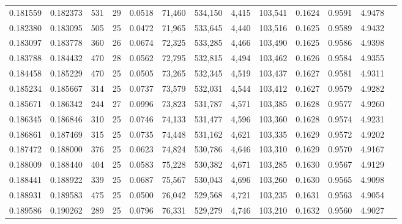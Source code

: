 \begin{tabular}{rrrrrrrrrrrrr}
0.181559 & 0.182373 &   531 &  29 &                                     0.0518 &  71,460 & 534,150 &   4,415 & 103,541 & 0.1624 & 0.9591 & 4.9478 \\
0.182380 & 0.183095 &   505 &  25 &                                     0.0472 &  71,965 & 533,645 &   4,440 & 103,516 & 0.1625 & 0.9589 & 4.9432 \\
0.183097 & 0.183778 &   360 &  26 &                                     0.0674 &  72,325 & 533,285 &   4,466 & 103,490 & 0.1625 & 0.9586 & 4.9398 \\
0.183788 & 0.184432 &   470 &  28 &                                     0.0562 &  72,795 & 532,815 &   4,494 & 103,462 & 0.1626 & 0.9584 & 4.9355 \\
0.184458 & 0.185229 &   470 &  25 &                                     0.0505 &  73,265 & 532,345 &   4,519 & 103,437 & 0.1627 & 0.9581 & 4.9311 \\
0.185234 & 0.185667 &   314 &  25 &                                     0.0737 &  73,579 & 532,031 &   4,544 & 103,412 & 0.1627 & 0.9579 & 4.9282 \\
0.185671 & 0.186342 &   244 &  27 &                                     0.0996 &  73,823 & 531,787 &   4,571 & 103,385 & 0.1628 & 0.9577 & 4.9260 \\
0.186345 & 0.186846 &   310 &  25 &                                     0.0746 &  74,133 & 531,477 &   4,596 & 103,360 & 0.1628 & 0.9574 & 4.9231 \\
0.186861 & 0.187469 &   315 &  25 &                                     0.0735 &  74,448 & 531,162 &   4,621 & 103,335 & 0.1629 & 0.9572 & 4.9202 \\
0.187472 & 0.188000 &   376 &  25 &                                     0.0623 &  74,824 & 530,786 &   4,646 & 103,310 & 0.1629 & 0.9570 & 4.9167 \\
0.188009 & 0.188440 &   404 &  25 &                                     0.0583 &  75,228 & 530,382 &   4,671 & 103,285 & 0.1630 & 0.9567 & 4.9129 \\
0.188441 & 0.188922 &   339 &  25 &                                     0.0687 &  75,567 & 530,043 &   4,696 & 103,260 & 0.1630 & 0.9565 & 4.9098 \\
0.188931 & 0.189583 &   475 &  25 &                                     0.0500 &  76,042 & 529,568 &   4,721 & 103,235 & 0.1631 & 0.9563 & 4.9054 \\
0.189586 & 0.190262 &   289 &  25 &                                     0.0796 &  76,331 & 529,279 &   4,746 & 103,210 & 0.1632 & 0.9560 & 4.9027 \\

\end{tabular}
